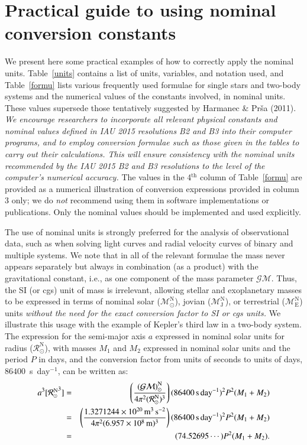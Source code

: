 \documentclass[preprint]{aastex}
\newcommand{\Rnom}{\hbox{$\mathcal{R}^{\mathrm N}_\odot$}}
\newcommand{\Mnom}{\hbox{$\mathcal{M}^{\mathrm N}_\odot$}}
\newcommand{\GMnom}{\hbox{$\mathcal{(GM)}^{\mathrm N}_\odot$}}
\newcommand{\MEnom}{\hbox{$\mathcal{M}^{\mathrm N}_\mathrm{E}$}}
\newcommand{\MJnom}{\hbox{$\mathcal{M}^{\mathrm N}_\mathrm{J}$}}
\newcommand{\rev}[1]{{#1}}
\begin{document}



\appendix

\section{Practical guide to using nominal conversion constants} \label{app:eqs}

We present here some practical examples of how to correctly apply the nominal units. Table~\ref{units} contains a list of units, variables, and notation used, and Table~\ref{formu} lists various frequently used formulae for single stars and two-body systems and the numerical values of the constants involved, in nominal units. These values supersede those tentatively suggested by Harmanec \& Pr\v{s}a (2011). {\sl We encourage researchers to incorporate all relevant physical constants and nominal values defined in IAU 2015 resolutions B2 and B3 into their computer programs, and to employ conversion formulae such as those given in the tables to carry out their calculations. This will ensure consistency with the nominal units recommended by the IAU 2015 B2 and B3 resolutions to the level of the computer's numerical accuracy.} The values in the 4$^\mathrm{th}$ column of Table~\ref{formu} are provided as a numerical illustration of conversion expressions provided in column 3 only; we do \emph{not} recommend using them in software implementations or publications. Only the nominal values should be implemented and used explicitly.

The use of nominal units is strongly preferred for the analysis of observational data, such as when solving light curves and radial velocity curves \rev{of binary and multiple systems}. We note that in all of the relevant formulae the mass never appears separately but always in combination (as a product) with the gravitational constant, i.e., as one component of the mass parameter $\mathcal{GM}$. Thus, the SI (or cgs) unit of mass is irrelevant, allowing stellar and exoplanetary masses to be expressed in terms of nominal solar (\Mnom), jovian (\MJnom), or terrestrial (\MEnom) units {\sl without the need for the exact conversion factor to SI or cgs units.} We illustrate this usage with the example of Kepler's third law in a two-body system. The expression for the semi-major axis \rev{$a$} expressed in nominal solar units for radius (\Rnom), with masses $M_1$ and $M_2$ expressed in nominal solar units and the period $P$ in days, and the conversion factor from units of seconds to units of days, $86400$~s~day$^{-1}$, can be written as:
%
\begin{eqnarray}
a^3 [\Rnom^3] & = &\left({\GMnom\over{4\pi^2(\Rnom)^3}}\right)(86400\,{\rm s}\,{\rm day}^{-1})^2P^2(M_1+M_2)\nonumber\\
& = &\left({{1.3271244 \times 10^{20}\,{\rm m}^3\,{\rm s}^{-2}}\over{4\pi^2(6.957 \times 10^8\,{\rm m})^3}}\right) (86400\,{\rm s}\,{\rm day}^{-1})^2 P^2(M_1+M_2) \nonumber\\
& = &  (74.52695 \cdots) P^2 (M_1 + M_2).
\end{eqnarray}
\end{document}
